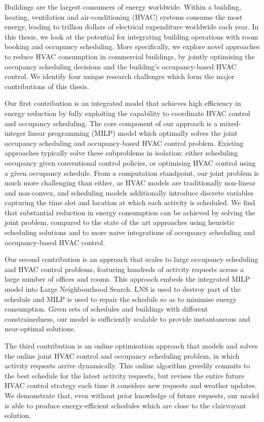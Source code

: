 \documentclass{article}
\begin{document}
Buildings are the largest consumers of energy worldwide. Within a building, heating, ventilation and air-conditioning (HVAC) systems consume the most energy, leading to trillion dollars of electrical expenditure worldwide each year. In this thesis, we look at the potential for integrating building operations with room booking and occupancy scheduling. More specifically, we explore novel approaches to reduce HVAC consumption in commercial buildings, by jointly optimising the occupancy scheduling decisions and the building's occupancy-based HVAC control. We identify four unique research challenges which form the major contributions of this thesis.

Our first contribution is an integrated model that achieves high efficiency in energy reduction by fully exploiting the capability to coordinate HVAC control and occupancy scheduling. The core component of our approach is a mixed-integer linear programming (MILP) model which optimally solves the joint occupancy scheduling and occupancy-based HVAC control problem. Existing approaches typically solve these subproblems in isolation: either scheduling occupancy given conventional control policies, or optimising HVAC control using a given occupancy schedule. From a computation standpoint, our joint problem is much more challenging than either, as HVAC models are traditionally non-linear and non-convex, and scheduling models additionally introduce discrete variables capturing the time slot and location at which each activity is scheduled. We find that substantial reduction in energy consumption can be achieved by solving the joint problem, compared to the state of the art approaches using heuristic scheduling solutions and to more naive integrations of occupancy scheduling and occupancy-based HVAC control.

Our second contribution is an approach that scales to large occupancy scheduling and HVAC control problems, featuring hundreds of activity requests across a large number of offices and rooms. This approach embeds the integrated MILP model into Large Neighbourhood Search.
LNS is used to destroy part of the schedule and MILP is used to repair the schedule so as to minimise energy consumption. Given sets of schedules and buildings with different constrainedness, our model is sufficiently scalable to provide instantaneous and near-optimal solutions.

The third contribution is an online optimisation approach that models and solves the online joint HVAC control and occupancy scheduling problem, in which activity requests arrive dynamically. This online algorithm greedily commits to the best schedule for the latest activity requests, but revises the entire future HVAC control strategy each time it considers new requests and weather updates. We demonstrate that, even without prior knowledge of future requests, our model is able to produce energy-efficient schedules which are close to the clairvoyant solution. 
\end{document}
